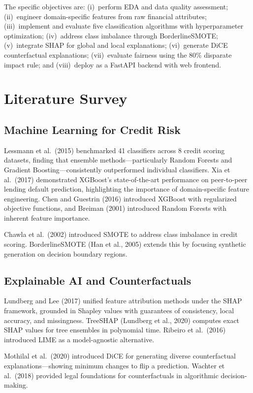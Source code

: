 \documentclass[12pt]{report}
\begin{document}
The specific objectives are: (i)~perform EDA and data quality assessment; (ii)~engineer domain-specific features from raw financial attributes; (iii)~implement and evaluate five classification algorithms with hyperparameter optimization; (iv)~address class imbalance through BorderlineSMOTE; (v)~integrate SHAP for global and local explanations; (vi)~generate DiCE counterfactual explanations; (vii)~evaluate fairness using the 80\% disparate impact rule; and (viii)~deploy as a FastAPI backend with web frontend.

\section{Literature Survey}

\subsection{Machine Learning for Credit Risk}

Lessmann et al.\ (2015) benchmarked 41 classifiers across 8 credit scoring datasets, finding that ensemble methods---particularly Random Forests and Gradient Boosting---consistently outperformed individual classifiers. Xia et al.\ (2017) demonstrated XGBoost's state-of-the-art performance on peer-to-peer lending default prediction, highlighting the importance of domain-specific feature engineering. Chen and Guestrin (2016) introduced XGBoost with regularized objective functions, and Breiman (2001) introduced Random Forests with inherent feature importance.

Chawla et al.\ (2002) introduced SMOTE to address class imbalance in credit scoring. BorderlineSMOTE (Han et al., 2005) extends this by focusing synthetic generation on decision boundary regions.

\subsection{Explainable AI and Counterfactuals}

Lundberg and Lee (2017) unified feature attribution methods under the SHAP framework, grounded in Shapley values with guarantees of consistency, local accuracy, and missingness. TreeSHAP (Lundberg et al., 2020) computes exact SHAP values for tree ensembles in polynomial time. Ribeiro et al.\ (2016) introduced LIME as a model-agnostic alternative.

Mothilal et al.\ (2020) introduced DiCE for generating diverse counterfactual explanations---showing minimum changes to flip a prediction. Wachter et al.\ (2018) provided legal foundations for counterfactuals in algorithmic decision-making.
\end{document}
